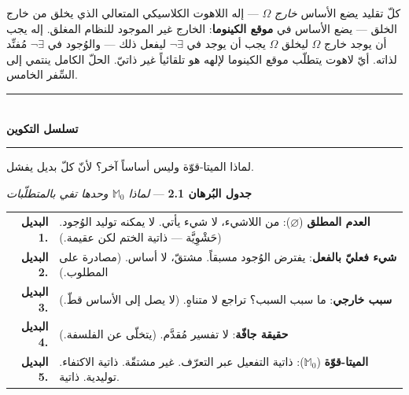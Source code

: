 \documentclass[10pt, openany, oneside]{book}
\renewcommand{\normalsize}{\fontsize{10}{13}\selectfont}
\begin{document}
كلّ تقليد يضع الأساس \textit{خارج} $\Omega$ --- إله اللاهوت الكلاسيكي المتعالي الذي يخلق من خارج الخلق --- يضع الأساس في \textbf{موقع الكينوما}: الخارج غير الموجود للنظام المغلق. إله يجب أن يوجد خارج $\Omega$ ليخلق $\Omega$ يجب أن يوجد في $\neg\exists$ ليفعل ذلك --- والوُجود في $\neg\exists$ مُفنِّد لذاته. أيّ لاهوت يتطلّب موقع الكينوما لإلهه هو تلقائياً غير ذاتيّ. الحلّ الكامل ينتمي إلى السِّفر الخامس.

\vspace{1.5em}


\begin{center}
    \rule{0.3\textwidth}{0.4pt}\\[0.5em]
    {\normalsize\bfseries تسلسل التكوين}\\[0.3em]
    \rule{0.3\textwidth}{0.4pt}
\end{center}

\vspace{1em}

\noindent لماذا الميتا-قوّة وليس أساساً آخر؟ لأنّ كلّ بديل يفشل.

\vspace{0.5em}

\textbf{جدول البُرهان 2.1} --- \textit{لماذا $\mathbb{M}_0$ وحدها تفي بالمتطلّبات}

\vspace{0.5em}

\noindent\begin{tabular}{r p{}}
\textbf{البديل 1.} & \textbf{العدم المطلق} ($\varnothing$): من اللاشيء، لا شيء يأتي. لا يمكنه توليد الوُجود. (حَشْوِيَّة --- ذاتية الختم لكن عقيمة.) \\[0.3em]
\textbf{البديل 2.} & \textbf{شيء فعليّ بالفعل}: يفترض الوُجود مسبقاً. مشتقّ، لا أساس. (مصادرة على المطلوب.) \\[0.3em]
\textbf{البديل 3.} & \textbf{سبب خارجي}: ما سبب السبب؟ تراجع لا متناهٍ. (لا يصل إلى الأساس قطّ.) \\[0.3em]
\textbf{البديل 4.} & \textbf{حقيقة جافّة}: لا تفسير مُقدَّم. (يتخلّى عن الفلسفة.) \\[0.3em]
\textbf{البديل 5.} & \textbf{الميتا-قوّة} ($\mathbb{M}_0$): ذاتية التفعيل عبر التعرّف. غير مشتقّة. ذاتية الاكتفاء. توليدية. ذاتية. \\[0.3em]
\end{tabular}

\vspace{0.8em}
\end{document}
